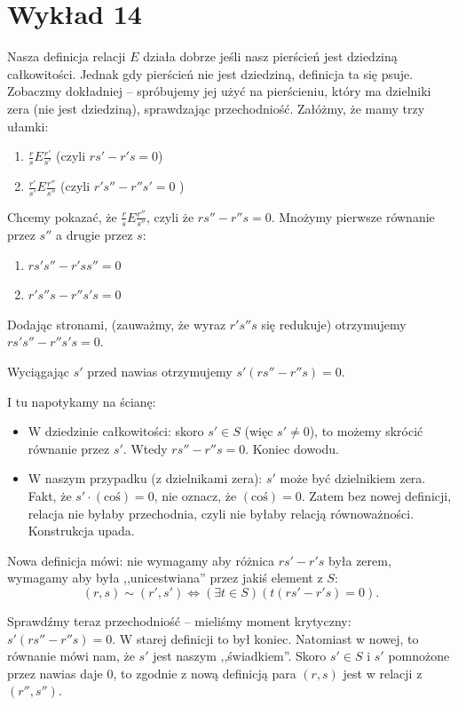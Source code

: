 \chapter{Wykład 14}

Nasza definicja relacji $E$ działa dobrze jeśli nasz pierścień jest dziedziną całkowitości. Jednak gdy pierścień nie jest dziedziną, definicja ta się psuje. Zobaczmy dokładniej -- spróbujemy jej użyć na pierścieniu, który ma dzielniki zera (nie jest dziedziną), sprawdzając przechodniość. Załóżmy, że mamy trzy ułamki:
\begin{enumerate}[label=\arabic*)]
	\item $\frac{r}{s} E \frac{r'}{s'}$ (czyli $rs' - r's = 0$)
	\item $\frac{r'}{s'}E \frac{r''}{s''}$ (czyli $r's'' - r''s' = 0$ )
\end{enumerate}
Chcemy pokazać, że $\frac{r}{s}E \frac{r''}{s''}$, czyli że $rs'' - r''s = 0$. Mnożymy pierwsze równanie przez $s''$ a drugie przez $s$:
 \begin{enumerate}[label=\arabic*)]
	\item $rs's'' - r'ss'' = 0$
	\item $r's''s - r''s's = 0$
\end{enumerate}
Dodając stronami, (zauważmy, że wyraz $r's''s$ się redukuje) otrzymujemy $rs's'' - r''s's = 0$.

Wyciągając  $s'$ przed nawias otrzymujemy $s'\left( rs'' - r''s  \right) = 0$.

I tu napotykamy na ścianę:
\begin{itemize}
	\item W dziedzinie całkowitości: skoro $s' \in S$ (więc $s' \neq 0$), to możemy skrócić równanie przez $s'$. Wtedy  $rs'' - r''s = 0$. Koniec dowodu.
	 \item W naszym przypadku (z dzielnikami zera): $s'$ może być dzielnikiem zera. Fakt, że $s'\cdot \left( \text{coś} \right)  = 0$, nie oznacz, że $\left( \text{coś} \right) = 0$. Zatem bez nowej definicji, relacja nie byłaby przechodnia, czyli nie byłaby relacją równoważności. Konstrukcja upada.
\end{itemize}

Nowa definicja mówi: nie wymagamy aby różnica $rs' - r's$ była zerem, wymagamy aby była ,,unicestwiana'' przez jakiś element z  $S$:
\[
	\left( r,s \right) \sim \left( r', s' \right) \iff \left(\exists t \in S \right)\left( t \left( rs' - r's \right) = 0 \right)   
.\] 

Sprawdźmy teraz przechodniość -- mieliśmy moment krytyczny: $s'\left( rs'' - r''s \right) = 0$. W starej definicji to był koniec. Natomiast w nowej, to równanie mówi nam, że $s'$ jest naszym ,,świadkiem''. Skoro $s' \in S$ i $s'$ pomnożone przez nawias daje $0$, to zgodnie z nową definicją para $\left( r,s \right) $ jest w relacji z $\left( r'',s'' \right) $.

